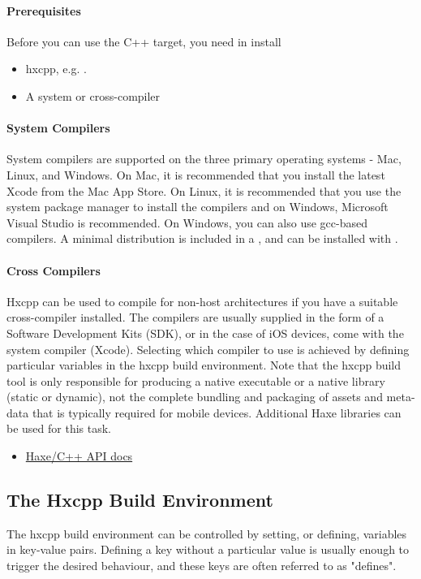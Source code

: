 \paragraph{Prerequisites}
Before you can use the C++ target, you need in install
\begin{itemize}
	\item hxcpp, e.g. .
	\item A system or cross-compiler
\end{itemize}

\paragraph{System Compilers}
System compilers are supported on the three primary operating systems - Mac, Linux, and Windows.  On Mac, it is recommended that you install the latest Xcode from the Mac App Store.  On Linux, it is recommended that you use the system package manager to install the compilers and on Windows, Microsoft Visual Studio is recommended.  On Windows, you can also use gcc-based compilers.  A minimal distribution is included in a , and can be installed with .

\paragraph{Cross Compilers}
Hxcpp can be used to compile for non-host architectures if you have a suitable cross-compiler installed.  The compilers are usually supplied in the form of a Software Development Kits (SDK), or in the case of iOS devices, come with the system compiler (Xcode).  Selecting which compiler to use is achieved by defining particular variables in the hxcpp build environment.  Note that the hxcpp build tool is only responsible for producing a native executable or a native library (static or dynamic), not the complete bundling and packaging of assets and meta-data that is typically required for mobile devices.  Additional Haxe libraries can be used for this task.

\begin{itemize}
	\item \href{https://api.haxe.org/cpp/}{Haxe/C++ API docs}
\end{itemize}

\subsection{The Hxcpp Build Environment}
\label{target-cpp-build-environment}
The hxcpp build environment can be controlled by setting, or defining, variables in key-value pairs. Defining a key without a particular value is usually enough to trigger the desired behaviour, and these keys are often referred to as "defines".

